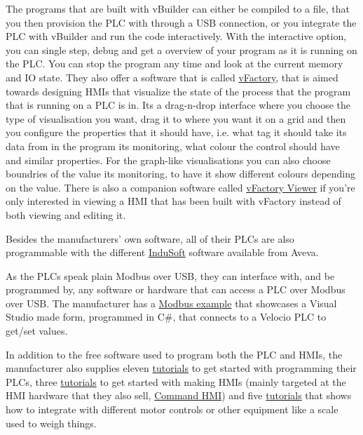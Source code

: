 \documentclass[11pt]{article}
\begin{document}
The programs that are built with vBuilder can either be compiled to a file, that you then provision the PLC with through a USB connection, or you integrate the PLC with vBuilder and run the code interactively. With the interactive option, you can single step, debug and get a overview of your program as it is running on the PLC. You can stop the program any time and look at the current memory and IO state. They also offer a software that is called \href{http://velocio.net/vfactory}{vFactory}, that is aimed towards designing HMIs that visualize the state of the process that the program that is running on a PLC is in. Its a drag-n-drop interface where you choose the type of visualisation you want, drag it to where you want it on a grid and then you configure the properties that it should have, i.e. what tag it should take its data from in the program its monitoring, what colour the control should have and similar properties. For the graph-like visualisations you can also choose boundries of the value its monitoring, to have it show different colours depending on the value. There is also a companion software called \href{http://velocio.net/vFactory\%20Viewer.exe}{vFactory Viewer} if you're only interested in viewing a HMI that has been built with vFactory instead of both viewing and editing it.

Besides the manufacturers' own software, all of their PLCs are also programmable with the different \href{http://velocio.net/indusoft/}{InduSoft} software available from Aveva.

As the PLCs speak plain Modbus over USB, they can interface with, and be programmed by, any software or hardware that can access a PLC over Modbus over USB. The manufacturer has a \href{http://velocio.net/modbus-example/}{Modbus example} that showcases a Visual Studio made form, programmed in C\#, that connects to a Velocio PLC to get/set values.

In addition to the free software used to program both the PLC and HMIs, the manufacturer also supplies eleven \href{http://velocio.net/tutorials/}{tutorials} to get started with programming their PLCs, three \href{http://velocio.net/tutorials}{tutorials} to get started with making HMIs (mainly targeted at the HMI hardware that they also sell, \href{http://velocio.net/hmi/}{Command HMI}) and five \href{http://velocio.net/hmi/}{tutorials} that shows how to integrate with different motor controls or other equipment like a scale used to weigh things.
\end{document}
